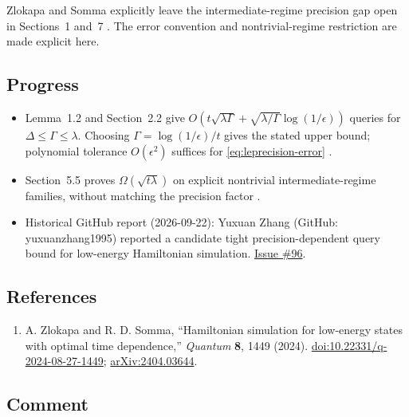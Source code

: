Zlokapa and Somma explicitly leave the intermediate-regime precision gap open in Sections~1 and~7 . The error convention and nontrivial-regime restriction are made explicit here.

\subsection*{Progress}

\begin{itemize}
  \item Lemma~1.2 and Section~2.2 give $O(t\sqrt{\lambda\Gamma}+\sqrt{\lambda/\Gamma}\log(1/\epsilon))$ queries for $\Delta\leq\Gamma\leq\lambda$. Choosing $\Gamma=\log(1/\epsilon)/t$ gives the stated upper bound; polynomial tolerance $O(\epsilon^2)$ suffices for \eqref{eq:leprecision-error} .

  \item Section~5.5 proves $\Omega(\sqrt{t\lambda})$ on explicit nontrivial intermediate-regime families, without matching the precision factor .

  \item Historical GitHub report (2026-09-22): Yuxuan Zhang (GitHub: yuxuanzhang1995) reported a candidate tight precision-dependent query bound for low-energy Hamiltonian simulation. \href{https://github.com/Naixu-Guo/quantum-open-problems/issues/96}{Issue \#96}.
\end{itemize}

\subsection*{References}

\begin{enumerate}[label={},leftmargin=4.8em,labelsep=0.5em]
  \footnotesize
  \item[\textup{[ZS24]}]\label{ref:leprecision-zlokapa-somma}
  A. Zlokapa and R. D. Somma, ``Hamiltonian simulation for low-energy states with optimal time dependence,'' \emph{Quantum} \textbf{8}, 1449 (2024).
\href{https://doi.org/10.22331/q-2024-08-27-1449}{doi:10.22331/q-2024-08-27-1449};
\href{https://arxiv.org/abs/2404.03644}{arXiv:2404.03644}.
\end{enumerate}

\subsection*{Comment}

